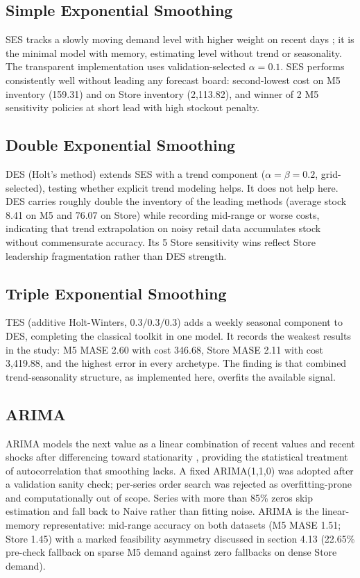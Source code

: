 \subsection{Simple Exponential Smoothing}
\label{sec:m-ses}
SES tracks a slowly moving demand level with higher weight on recent days
\citep{hyndman2018}; it is the minimal model with memory, estimating level
without trend or seasonality. The transparent implementation uses
validation-selected $\alpha=0.1$. SES performs consistently well without
leading any forecast board: second-lowest cost on M5 inventory (159.31) and
on Store inventory (2,113.82), and winner of 2 M5 sensitivity policies at
short lead with high stockout penalty.

\subsection{Double Exponential Smoothing}
\label{sec:m-des}
DES (Holt's method) extends SES with a trend component
($\alpha=\beta=0.2$, grid-selected), testing whether explicit trend modeling
helps. It does not help here. DES carries roughly double the inventory of the
leading methods (average stock 8.41 on M5 and 76.07 on Store) while recording
mid-range or worse costs, indicating that trend extrapolation on noisy retail
data accumulates stock without commensurate accuracy. Its 5 Store sensitivity
wins reflect Store leadership fragmentation rather than DES strength.

\subsection{Triple Exponential Smoothing}
\label{sec:m-tes}
TES (additive Holt-Winters, $0.3/0.3/0.3$) adds a weekly seasonal component to
DES, completing the classical toolkit in one model. It records the weakest
results in the study: M5 MASE 2.60 with cost 346.68, Store MASE 2.11 with cost
3,419.88, and the highest error in every archetype. The finding is that
combined trend-seasonality structure, as implemented here, overfits the
available signal.

\subsection{ARIMA}
\label{sec:m-arima}
ARIMA models the next value as a linear combination of recent values and
recent shocks after differencing toward stationarity
\citep{box1970,hyndman2018}, providing the statistical treatment of
autocorrelation that smoothing lacks. A fixed ARIMA(1,1,0) was adopted after
a validation sanity check; per-series order search was rejected as
overfitting-prone and computationally out of scope. Series with more than 85\%
zeros skip estimation and fall back to Naive rather than fitting noise. ARIMA
is the linear-memory representative: mid-range accuracy on both datasets (M5
MASE 1.51; Store 1.45) with a marked feasibility asymmetry discussed in
section 4.13 (22.65\% pre-check fallback on sparse M5 demand against
zero fallbacks on dense Store demand).

